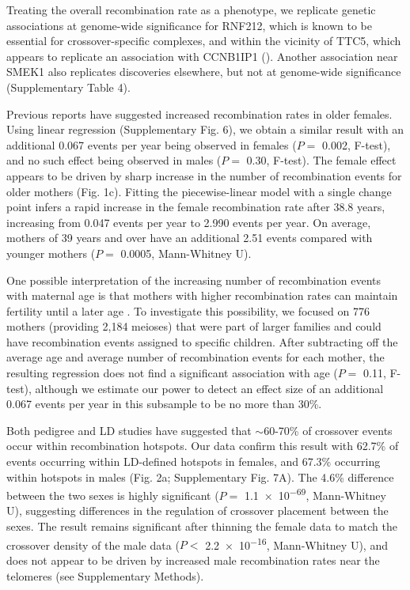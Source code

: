 Treating the overall recombination rate as a phenotype, we
replicate genetic associations at genome-wide significance for
RNF212, which is known to be essential for crossover-specific
complexes\cite{Reynolds2013}, and within the vicinity of TTC5, which appears
to replicate an association with CCNB1IP1 (\citet{Kong2014}). Another
association near SMEK1 also replicates discoveries elsewhere\cite{Kong2014},
but not at genome-wide significance (Supplementary Table 4).

Previous reports have suggested increased recombination rates
in older females\cite{Kong2004,Coop2008}. Using linear regression (Supplementary
Fig. 6), we obtain a similar result with an additional 0.067
events per year being observed in females ($P=$ 0.002, F-test), and
no such effect being observed in males ($P=$ 0.30, F-test). The
female effect appears to be driven by sharp increase in the
number of recombination events for older mothers (Fig. 1c).
Fitting the piecewise-linear model with a single change point
infers a rapid increase in the female recombination rate after 38.8
years, increasing from 0.047 events per year to 2.990 events per
year. On average, mothers of 39 years and over have an additional
2.51 events compared with younger mothers ($P=$ 0.0005,
Mann-Whitney U).

One possible interpretation of the increasing number of
recombination events with maternal age is that mothers with
higher recombination rates can maintain fertility until a later
age\cite{Kong2004} . To investigate this possibility, we focused on 776 mothers
(providing 2,184 meioses) that were part of larger families and
could have recombination events assigned to specific children.
After subtracting off the average age and average number of
recombination events for each mother, the resulting regression
does not find a significant association with age ($P=$ 0.11, F-test),
although we estimate our power to detect an effect size of an
additional 0.067 events per year in this subsample to be no more
than 30\%.

Both pedigree and LD studies have suggested that $\sim$60-70\% of
crossover events occur within recombination hotspots\cite{Coop2008,Myers2005}. Our
data confirm this result with 62.7\% of events occurring within
LD-defined hotspots in females, and 67.3\% occurring within
hotspots in males (Fig. 2a; Supplementary Fig. 7A). The 4.6\%
difference between the two sexes is highly significant
($P=$ \num{1.1e-69}, Mann-Whitney U), suggesting differences in
the regulation of crossover placement between the sexes. The
result remains significant after thinning the female data to match
the crossover density of the male data ($P<$ \num{2.2e-16},
Mann-Whitney U), and does not appear to be driven by
increased male recombination rates near the telomeres (see
Supplementary Methods).

